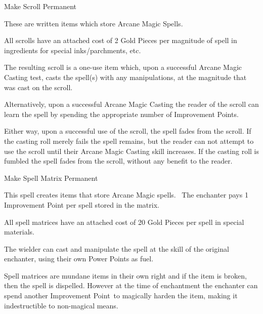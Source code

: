 %
%


\begin{rpg-spell}
{Make Scroll}
{Permanent}

These are written items which store Arcane Magic Spells.

All scrolls have an attached cost of 2 Gold Pieces per magnitude of spell in ingredients for special inks/parchments, etc.

The resulting scroll is a one-use item which, upon a successful Arcane Magic Casting test, casts the spell(s) with any manipulations, at the magnitude that was cast on the scroll.

Alternatively, upon a successful Arcane Magic Casting the reader of the scroll can learn the spell by spending the appropriate number of Improvement Points.

Either way, upon a successful use of the scroll, the spell fades from the scroll. If the casting roll merely fails the spell remains, but the reader can not attempt to use the scroll until their Arcane Magic Casting skill increases. If the casting roll is fumbled the spell fades from the scroll, without any benefit to the reader.
\end{rpg-spell}


\begin{rpg-spell}
{Make Spell Matrix}
{Permanent}

This spell creates items that store Arcane Magic spells. 
The enchanter pays 1 Improvement Point per spell stored in the matrix.

All spell matrices have an attached cost of 20 Gold Pieces per spell in special materials.

The wielder can cast and manipulate the spell at the skill of the original enchanter, using their own Power Points as fuel.

Spell matrices are mundane items in their own right and if the item is broken, then the spell is dispelled. However at the time of enchantment the enchanter can spend another Improvement Point to magically harden the item, making it indestructible to non-magical means. %
\end{rpg-spell}


